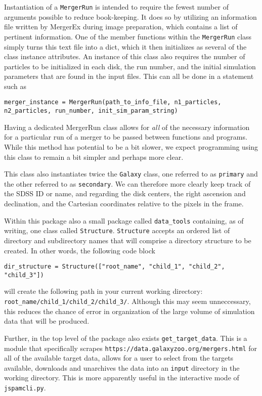 Instantiation of a \texttt{MergerRun} is intended to require the fewest number
of arguments possible to reduce book-keeping. It does so by utilizing an
information file written by MergerEx during image preparation, which contains
a list of pertinent information. One of the member functions within the
\texttt{MergerRun} class simply turns this text file into a dict, which it then
initializes as several of the class instance attributes. An instance of this
class also requires the number of particles to be initialized in each disk, the
run number, and the initial simulation parameters that are found in the input
files. This can all be done in a statement such as

\begin{lstlisting}
merger_instance = MergerRun(path_to_info_file, n1_particles, n2_particles, run_number, init_sim_param_string)
\end{lstlisting}

Having a dedicated MergerRun class allows for \textit{all} of the necessary
information for a particular run of a merger to be passed between functions and
programs. While this method has potential to be a bit slower, we expect
programming using this class to remain a bit simpler and perhaps more clear.

This class also instantiates twice the \texttt{Galaxy} class,
one referred to as \texttt{primary} and the other referred to as
\texttt{secondary}. We can therefore more clearly keep track of the SDSS ID or
name, and regarding the disk centers, the right ascension and declination, and
the Cartesian coordinates relative to the pixels in the frame.

Within this package also a small package called \texttt{data\_tools} containing,
as of writing, one class called \texttt{Structure}. \texttt{Structure} accepts
an ordered list of directory and subdirectory names that will comprise a
directory structure to be created. In other words, the following code block

\begin{lstlisting}
dir_structure = Structure(["root_name", "child_1", "child_2", "child_3"])
\end{lstlisting}

will create the following path in your current working directory:
\texttt{root\_name/child\_1/child\_2/child\_3/}. Although this may seem
unneccessary, this reduces the chance of error in organization of the large
volume of simulation data that will be produced.

Further, in the top level of the package also exists \texttt{get\_target\_data}.
This is a module that specifically scrapes
\texttt{https://data.galaxyzoo.org/mergers.html} for all of the
available target data, allows for a user to select from the targets available,
downloads and unarchives the data into an \texttt{input} directory in the
working directory. This is more apparently useful in the interactive
mode of \texttt{jspamcli.py}.

